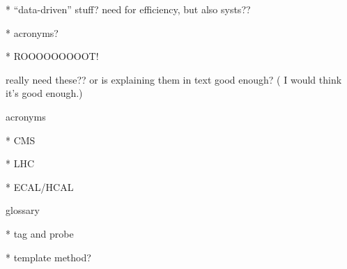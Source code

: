    * ``data-driven'' stuff?  need for efficiency, but also systs??

   * acronyms?  

   * ROOOOOOOOOT!




really need these??  or is explaining them in text good enough?  (
I would think it's good enough.)

acronyms

   * CMS

   * LHC

   * ECAL/HCAL



glossary

   * tag and probe

   * template method?